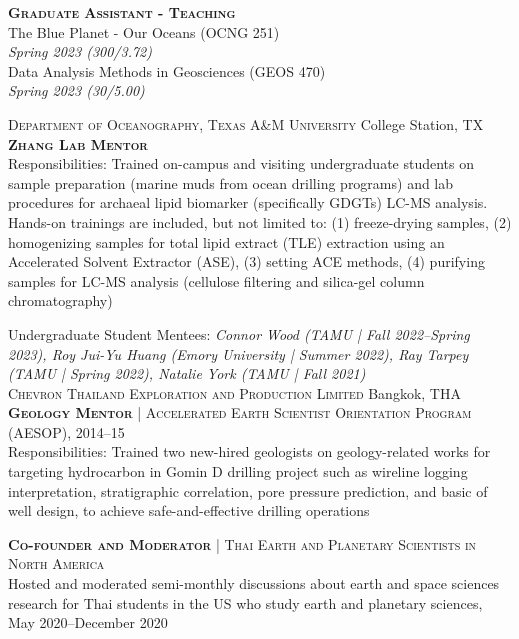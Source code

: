 \documentclass[10pt, letter]{article}
\newcommand{\margintext}[1]{\marginnote{\normalsize\textbf #1 |}}
\begin{document}
\bigskip
\textbf{\textsc{Graduate Assistant - Teaching}} \\
The Blue Planet - Our Oceans (OCNG 251) \\
\textit{Spring 2023 (300/3.72)} \\
Data Analysis Methods in Geosciences (GEOS 470) \\
\textit{Spring 2023 (30/5.00)}

\bigskip
\margintext{Mentoring}
\textsc{Department of Oceanography, Texas A\&M University} \hfill College Station, TX \\
\textsc{\textbf{Zhang Lab Mentor}}\\
\footnotesize 
{\color{gray} Responsibilities: Trained on-campus and visiting undergraduate students on sample preparation (marine muds from ocean drilling programs) and lab procedures for archaeal lipid biomarker (specifically GDGTs) LC-MS analysis. Hands-on trainings are included, but not limited to: (1) freeze-drying samples, (2) homogenizing samples for total lipid extract (TLE) extraction using an Accelerated Solvent Extractor (ASE), (3) setting ACE methods, (4) purifying samples for LC-MS analysis (cellulose filtering and silica-gel column chromatography)}

\normalsize
\bigskip
Undergraduate Student Mentees: \textit{Connor Wood (TAMU | Fall 2022–Spring 2023), Roy Jui-Yu Huang (Emory University | Summer 2022), Ray Tarpey (TAMU | Spring 2022), Natalie York (TAMU | Fall 2021)} \\

\textsc{Chevron Thailand Exploration and Production Limited} \hfill Bangkok, THA \\
\textsc{\textbf{Geology Mentor}} | \textsc{Accelerated Earth Scientist Orientation Program (AESOP)}, 2014–15 \\
\footnotesize 
{\color{gray} Responsibilities: Trained two new-hired geologists on geology-related works for targeting hydrocarbon in Gomin D drilling project such as wireline logging interpretation, stratigraphic correlation, pore pressure prediction, and basic of well design, to achieve safe-and-effective drilling operations}

\normalsize
\bigskip
\margintext{Leaderships}
\textsc{\textbf{Co-founder and Moderator}} | \textsc{Thai Earth and Planetary Scientists in North America} \\
Hosted and moderated semi-monthly discussions about earth and space sciences research for Thai students in the US who study earth and planetary sciences, May 2020–December 2020
\end{document}
